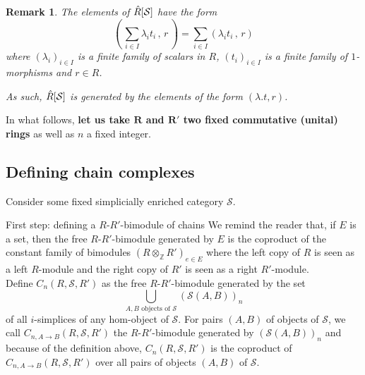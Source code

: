 \documentclass[a4paper,fleqn]{cas-sc}
\newtheorem{rem}{Remark}%
\newcommand{\cS}{{\mathcal{S}}}
\begin{document}
\begin{rem} The elements
of $\Hat{R}[\cS]$ have the form
\[ \left(\,\sum_{i \in I} \lambda_i t_i \, , \, r \,\right)
= \sum_{i \in I} \left( \lambda_i t_i \,,\, r \right) \]
where $(\lambda_i)_{i \in I}$ is a finite family of scalars in $R$, $(t_i)_{i \in I}$ is a finite family of $1$-morphisms and $r \in R$.

As such, $\Hat{R}[\cS]$ is generated by the elements of the form $(\lambda.t, r)$.
\end{rem}


In what follows, \textbf{let us take $\mathbf{R}$ and $\mathbf{R'}$ two fixed commutative (unital) rings} as well as $n$ a fixed integer.

\subsection{Defining chain complexes}
Consider some fixed simplicially enriched category $\cS$.

\begin{paragraph}{First step: defining a $R$-$R'$-bimodule of chains}
We remind the reader that, if $E$ is a set, then the free $R$-$R'$-bimodule generated by $E$ is the coproduct of the constant family of bimodules $\left( R \otimes_{\mathbb{Z}} R' \right)_{e \in E}$ where the left copy of $R$ is seen as a left $R$-module and the right copy of $R'$ is seen as a right $R'$-module.\\

Define $C_n \left( R, \cS, R'\right)$ as the free $R$-$R'$-bimodule generated by the set 
\[\bigcup_{A, B \text{ objects of } \cS} 
\left( \cS(A,B) \right)_n\]
of all $i$-simplices of any hom-object of $\cS$. 
For pairs $(A,B)$ of objects of $\cS$, we call $C_{n, A \to B} \left( R, \cS, R'\right)$ the $R$-$R'$-bimodule  generated by $\left( \cS(A,B) \right)_n$ and because of the definition above, $C_n \left( R, \cS, R'\right)$ is the coproduct of $C_{n, A \to B} \left( R, \cS, R'\right)$ over all pairs of objects $(A,B)$ of $\cS$. 

\end{paragraph}
\end{document}
